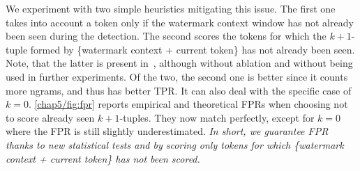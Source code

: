 We experiment with two simple heuristics mitigating this issue.
The first one takes into account a token only if the watermark context window has not already been seen during the detection.
The second scores the tokens for which the $k+1$-tuple formed by \{watermark context + current token\} has not already been seen.
Note, that the latter is present in~\citep{kirchenbauer2023watermark}, although without ablation and without being used in further experiments.
Of the two, the second one is better since it counts more ngrams, and thus has better TPR. 
It can also deal with the specific case of $k=0$.
\autoref{chap5/fig:fpr} reports empirical and theoretical FPRs when choosing not to score already seen $k+1$-tuples.
They now match perfectly, except for $k=0$ where the FPR is still slightly underestimated.
\emph{In short, we guarantee FPR thanks to new statistical tests and by scoring only tokens for which \{watermark context + current token\} has not been scored.}
